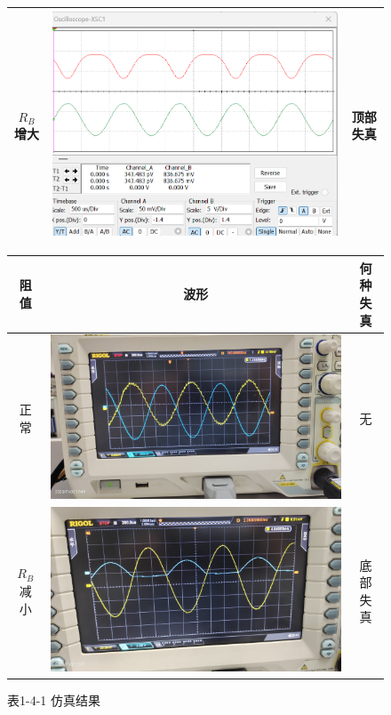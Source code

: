 \documentclass[a4paper,10pt,notitlepage]{article}
\begin{document}
\begin{enumerate}
\begin{figure}[h]
\begin{minipage}{0.19\textwidth}
\begin{tabular}{|c|c|c|}
						\hline
						$R_B$增大 & \includegraphics[width=\textwidth]{1-12.png} & 顶部失真 \\
						\hline
					\end{tabular}
					\caption*{表1-4-1 仿真结果}
				\end{minipage}
					\hspace{6.5cm}
				\begin{minipage}{0.19\textwidth}
					\begin{tabular}{|c|c|c|}
						\hline
						阻值 & 波形 & 何种失真 \\
						\hline
						正常 & \includegraphics[width=\textwidth]{1-13.jpg} & 无 \\
						\hline
						$R_B$减小 & \includegraphics[width=\textwidth]{1-14.jpg} & 底部失真 \\

\end{tabular}
\end{minipage}
\end{figure}
\end{enumerate}
\end{document}
